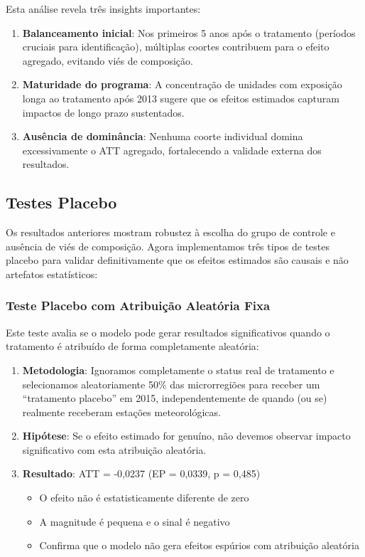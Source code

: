 \documentclass[
	12pt,				%
	oneside,			%
	a4paper,			%
	english,			%
	french,				%
	spanish,			%
	brazil				%
	]{abntex2}
\begin{document}
Esta análise revela três insights importantes:

\begin{enumerate}
\item \textbf{Balanceamento inicial}: Nos primeiros 5 anos após o tratamento (períodos cruciais para identificação), múltiplas coortes contribuem para o efeito agregado, evitando viés de composição.

\item \textbf{Maturidade do programa}: A concentração de unidades com exposição longa ao tratamento após 2013 sugere que os efeitos estimados capturam impactos de longo prazo sustentados.

\item \textbf{Ausência de dominância}: Nenhuma coorte individual domina excessivamente o ATT agregado, fortalecendo a validade externa dos resultados.
\end{enumerate}

\subsection{Testes Placebo}

Os resultados anteriores mostram robustez à escolha do grupo de controle e ausência de viés de composição. Agora implementamos três tipos de testes placebo para validar definitivamente que os efeitos estimados são causais e não artefatos estatísticos:

\subsubsection{Teste Placebo com Atribuição Aleatória Fixa}

Este teste avalia se o modelo pode gerar resultados significativos quando o tratamento é atribuído de forma completamente aleatória:

\begin{enumerate}
\item \textbf{Metodologia}: Ignoramos completamente o status real de tratamento e selecionamos aleatoriamente 50\% das microrregiões para receber um ``tratamento placebo'' em 2015, independentemente de quando (ou se) realmente receberam estações meteorológicas.

\item \textbf{Hipótese}: Se o efeito estimado for genuíno, não devemos observar impacto significativo com esta atribuição aleatória.

\item \textbf{Resultado}: ATT = -0,0237 (EP = 0,0339, p = 0,485)
\begin{itemize}
\item O efeito não é estatisticamente diferente de zero
\item A magnitude é pequena e o sinal é negativo
\item Confirma que o modelo não gera efeitos espúrios com atribuição aleatória
\end{itemize}
\end{enumerate}
\end{document}

